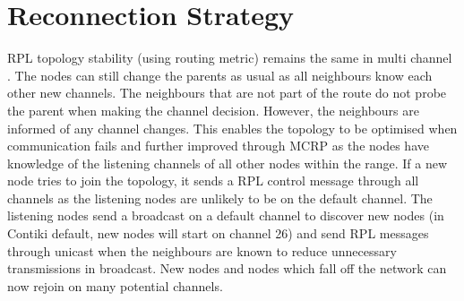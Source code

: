 \section{Reconnection Strategy}
RPL topology stability (using routing metric) remains the same in multi channel \cite{routingmetrics, winter2012rpl}.
The nodes can still change the parents as usual as all neighbours know each other new channels. The neighbours that are not part of the route do not probe the parent when making the channel decision. However, the neighbours are informed of any channel changes.
This enables the topology to be optimised when communication fails and further improved through MCRP as the nodes have knowledge of the listening channels of all other nodes within the range. If a new node tries to join the topology, it sends a RPL control message through all channels as the listening nodes are unlikely to be on the default channel. The listening nodes send a broadcast on a default channel to discover new nodes (in Contiki default, new nodes will start on channel 26) and send RPL messages through unicast when the neighbours are known to reduce unnecessary transmissions in broadcast. New nodes and nodes which fall off the network can now rejoin on many potential channels.